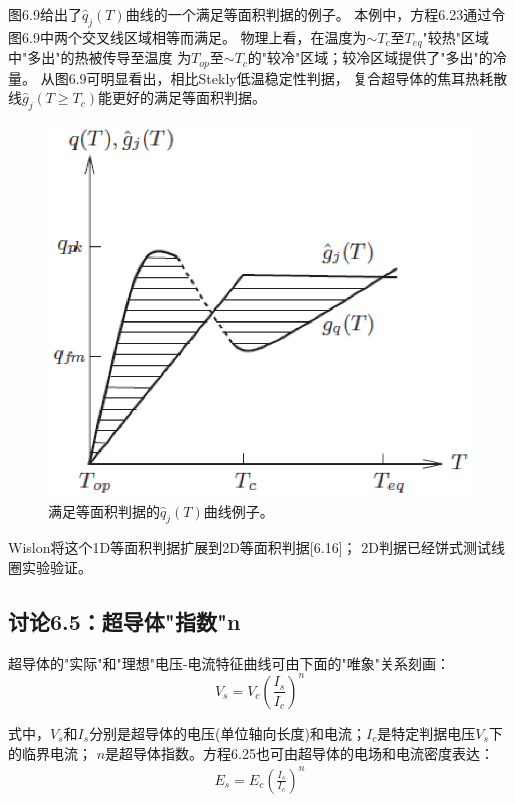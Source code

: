 图6.9给出了$\hat{q}_j(T)$曲线的一个满足等面积判据的例子。
本例中，方程6.23通过令图6.9中两个交叉线区域相等而满足。
物理上看，在温度为$\sim T_c$至$T_{eq}$"较热"区域中"多出"的热被传导至温度
为$T_{op}$至$\sim T_{c}$的"较冷"区域；较冷区域提供了"多出"的冷量。
从图6.9可明显看出，相比Stekly低温稳定性判据，
复合超导体的焦耳热耗散线$\hat{g}_j(T\ge T_c)$能更好的满足等面积判据。
\begin{figure}[htbp]
	\centering
	\includegraphics[scale=0.7]{chpt6/figs/fig6.9.eps}
	\caption{满足等面积判据的$\hat{q}_j(T)$曲线例子。}
\end{figure}

Wislon将这个1D等面积判据扩展到2D等面积判据[6.16]；
2D判据已经饼式测试线圈实验验证。

\subsection{讨论6.5：超导体"指数"n}
超导体的"实际"和"理想"电压-电流特征曲线可由下面的"唯象"关系刻画：
\begin{equation}%
V_s=V_c(\frac{I_s}{I_c})^n
\end{equation}

式中，$V_s$和$I_s$分别是超导体的电压(单位轴向长度)和电流；$I_c$是特定判据电压$V_s$下的临界电流；
$n$是超导体指数。方程6.25也可由超导体的电场和电流密度表达：
\begin{align*}%
E_s=E_c(\frac{I_s}{I_c})^n \tag{6.25'}
\end{align*}


